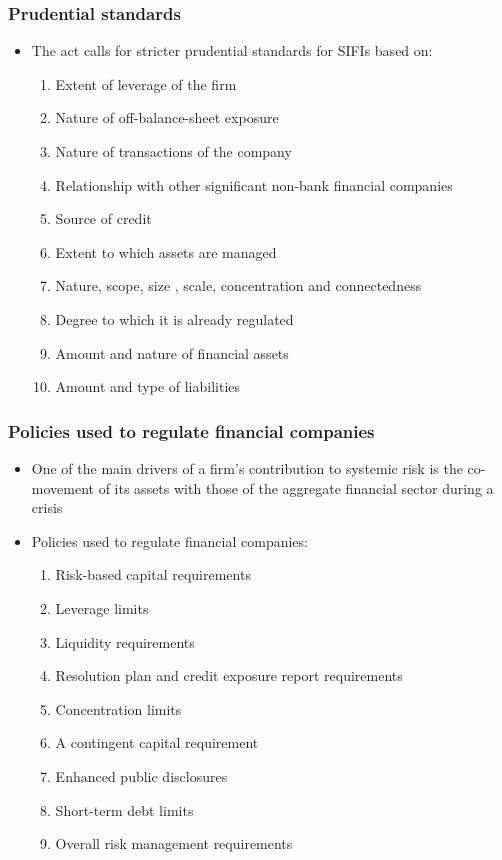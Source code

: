 \documentclass[11pt]{beamer}
\begin{document}
\begin{frame}
\frametitle{Prudential standards}
\begin{itemize}
	\item The act calls for stricter prudential standards for SIFIs based on:
  	\begin{enumerate}\itemsep5pt
      \item Extent of leverage of the firm
      \item Nature of off-balance-sheet exposure
      \item Nature of transactions of the company
      \item Relationship with other significant non-bank financial companies
      \item Source of credit
      \item Extent to which assets are managed
      \item Nature, scope, size , scale, concentration and connectedness
      \item Degree to which it is already regulated
      \item Amount and nature of financial assets
      \item Amount and type of liabilities
	\end{enumerate}
\end{itemize}
\end{frame}


\begin{frame}
\frametitle{Policies used to regulate financial companies}
\begin{itemize}\itemsep10pt
\item One of the main drivers of a firm's contribution to systemic risk is the co-movement of its assets with those of the aggregate financial sector during a crisis
\item Policies used to regulate financial companies:
\begin{enumerate}\itemsep5pt
\item Risk-based capital requirements
\item Leverage limits
\item Liquidity requirements
\item Resolution plan and credit exposure report requirements
\item Concentration limits
\item A contingent capital requirement
\item Enhanced public disclosures
\item Short-term debt limits
\item Overall risk management requirements
\end{enumerate}
\end{itemize}
\end{frame}
\end{document}
